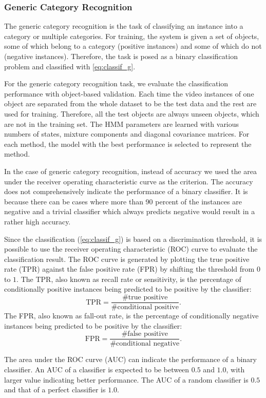 \documentclass[letterpaper, 10 pt, conference]{ieeeconf}
\begin{document}
\subsubsection{Generic Category Recognition}
The generic category recognition is the task of classifying an instance into a category or multiple categories. For training, the system is given a set of objects, some of which belong to a category (positive instances) and some of which do not (negative instances). Therefore, the task is posed as a binary classification problem and classified with \cref{eq:classif_g}.

For the generic category recognition task, we evaluate the classification performance with object-based validation. Each time the video instances of one object are separated from the whole dataset to be the test data and the rest are used for training. Therefore, all the test objects are always unseen objects, which are not in the training set. The HMM parameters are learned with various numbers of states, mixture components and diagonal covariance matrices. For each method, the model with the best performance is selected to represent the method.

In the case of generic category recognition, instead of accuracy we used the area under the receiver operating characteristic curve as the criterion. The accuracy does not comprehensively indicate the performance of a binary classifier. It is because there can be cases where more than 90 percent of the instances are negative and a trivial classifier which always predicts negative would result in a rather high accuracy.

Since the classification (\cref{eq:classif_g}) is based on a discrimination threshold, it is possible to use the receiver operating characteristic (ROC) curve to evaluate the classification result. The ROC curve is generated by plotting the true positive rate (TPR) against the false positive rate (FPR) by shifting the threshold from $0$ to $1$. The TPR, also known as recall rate or sensitivity, is the percentage of conditionally positive instances being predicted to be positive by the classifier:
\[ \text{TPR} =  \frac{\text{\# true positive}}{\text{\# conditional positive}} . \]
The FPR, also known as fall-out rate, is the percentage of conditionally negative instances being predicted to be positive by the classifier:
\[ \text{FPR} =  \frac{\text{\# false positive}}{\text{\# conditional negative}} . \]

The area under the ROC curve (AUC) can indicate the performance of a binary classifier. An AUC of a classifier is expected to be between $0.5$ and $1.0$, with larger value indicating better performance. The AUC of a random classifier is $0.5$ and that of a perfect classifier is $1.0$.
\end{document}
